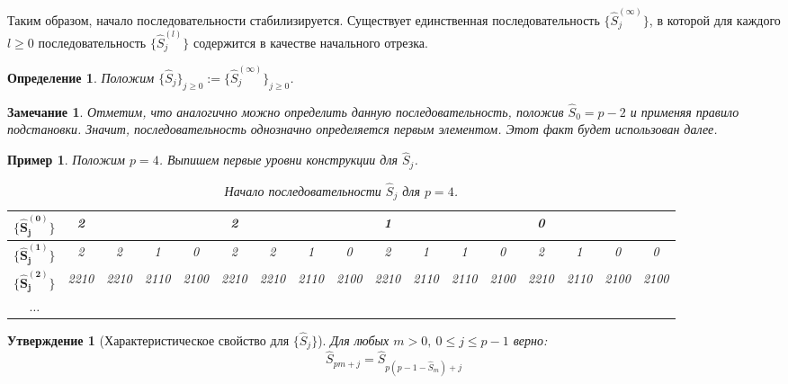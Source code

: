 \documentclass[14pt, a4paper, russian]{report}
\newtheorem{remark}{\indent Замечание}
\newtheorem{definition}{\indent Определение}
\newtheorem{proposition}{\indent Утверждение}
\newtheorem{example}{\indent Пример}
\begin{document}
Таким образом, начало последовательности стабилизируется. Существует единственная последовательность $\{ \hat{S}_j^{(\infty)}\}$, в которой для каждого $l \ge 0$ последовательность $\{ \hat{S}_j^{(l)}\}$ содержится в качестве начального отрезка.
\begin{definition}
Положим $\{\hat{S}_j\}_{j \ge 0} := \{ \hat{S}_j^{(\infty)}\}_{j \ge 0}$.
\end{definition}

\begin{remark}
Отметим, что аналогично можно определить данную последовательность, положив $\hat{S}_0 = p-2$ и применяя правило подстановки. Значит, последовательность однозначно определяется первым элементом. Этот факт будет использован далее.
\end{remark}
\begin{example}
Положим $p=4$. Выпишем первые уровни конструкции для $\hat{S}_j$.


\begin{table}[H]\label{table:Sj}
\begin{footnotesize}
\begin{center}
\begin{tabular}{|c|cccc|cccc|cccc|cccc|}
\hline
$\{ \mathbf{\hat{S}_j^{(0)}}\}$ & 2 & & & & 2 & & & & 1 & & & & 0 & & & \\
\hline
$\{ \mathbf{\hat{S}_j^{(1)}}\}$ & 2 & 2 & 1 & 0 & 2 & 2 & 1 & 0 & 2 & 1 & 1 & 0 & 2 & 1 & 0 & 0 \\
\hline

$\{ \mathbf{\hat{S}_j^{(2)}}\}$ &
\tiny{2210} & \tiny{2210} & \tiny{2110} & \tiny{2100} &
\tiny{2210} & \tiny{2210} & \tiny{2110} & \tiny{2100} &
\tiny{2210} & \tiny{2110} & \tiny{2110} & \tiny{2100} &
\tiny{2210} & \tiny{2110} & \tiny{2100} & \tiny{2100} \\

\hline
 $\mathbf{\ldots}$ & & & & & & & & & & & & & & & & \\
\hline
\end{tabular}
\end{center}
\end{footnotesize}
\caption{Начало последовательности $\hat{S}_j$ для $p=4$.}
\end{table}
\end{example}
\begin{proposition}[Характеристическое свойство для $\{\hat{S}_j\}$]\label{charProp}
Для любых $m > 0,\ 0 \le j \le p-1$ верно: 
\begin{equation}\label{eq:charProp}
\hat{S}_{pm+j}=\hat{S}_{p(p-1-\hat{S}_m) + j}
\end{equation}
\end{proposition}
\end{document}

